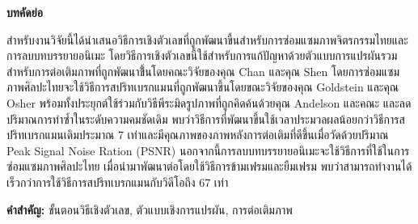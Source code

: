 \thispagestyle{empty}
\vspace{2 cm}
{\huge \bf บทคัดย่อ}

\vspace{2 cm}

\hspace{1cm} สำหรับงานวิจัยนี้ได้นำเสนอวิธีการเชิงตัวเลขที่ถูกพัฒนาขี้นสำหรับการซ่อมแซมภาพจิตรกรรมไทยและการลบบทบรรยายอนิเมะ โดยวิธีการเชิงตัวเลขนี้ใช้สำหรับการแก้ปัญหาด้วยตัวแบบการแปรผันรวมสำหรับการต่อเติมภาพที่ถูกพัฒนาขึ้้นโดยคณะวิจัยของคุณ Chan และคุณ Shen \cite{ref:rof-inpaint-chan-shen} โดยการซ่อมแซมภาพศิลปะไทยจะใช้วิธีการสปริทเบรกแมนที่ถูกพัฒนาขึ้นโดยขณะวิจัยของคุณ Goldstein และคุณ Osher \cite{ref:splitbergman-inpaint} พร้อมทั้งประยุกต์ใช้ร่วมกับวิธีพีระมิดรูปภาพที่ถูกคิดค้นด้วยคุณ Andelson และคณะ  \cite{ref:image-pyramid} และลดปริมาณการทำซ้ำในระดับความคมชัดเดิม พบว่าวิธีการที่พัฒนาขึ้นใช้เวลาประมวลผลน้อยกว่าวิธีการสปริทเบรกแมนเดิมประมาณ 7 เท่าและมีคุณภาพของภาพหลังการต่อเติมที่ดีขึ้นเมื่อวัดด้วยปริมาณ Peak Signal Noise Ration (PSNR) \cite{ref:PSNR} นอกจากนี้การลบบทบรรยายอนิเมะจะใช้วิธีการที่ใช้ในการซ่อมแซมภาพศิลปะไทย เมื่อนำมาพัฒนาต่อโดยใช้วิธีการข้ามเฟรมและยืมเฟรม พบว่าสามารถทำงานได้เร็วกว่าการใช้วิธีการสปริทเบรกแมนกับวิดีโอถึง 67 เท่า 

\vspace{1 cm}
{\bf{คำสำคัญ:}} ขั้นตอนวิธีเชิงตัวเลข, ตัวแบบเชิงการแปรผัน, การต่อเติมภาพ\\
\newpage